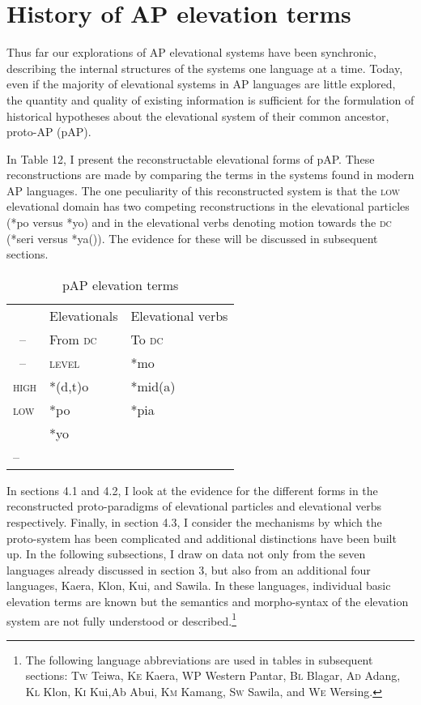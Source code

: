 \section{History of AP elevation terms}
Thus far our explorations of AP elevational systems have been synchronic, describing the internal structures of the systems one language at a time. Today, even if the majority of elevational systems in AP languages are little explored, the quantity and quality of existing information is sufficient for the formulation of historical hypotheses about the elevational system of their common ancestor, proto-AP (pAP).

In Table 12, I present the reconstructable elevational forms of pAP. These reconstructions are made by comparing the terms in the systems found in modern AP languages. The one peculiarity of this reconstructed system is that the \textsc{low} elevational domain has two competing reconstructions in the elevational particles (*po versus *yo) and in the elevational verbs denoting motion towards the \textsc{dc} (*seri versus *ya({\ng})). The evidence for these will be discussed in subsequent sections.




\begin{table}


\begin{tabular}{lll}
 & Elevationals& Elevational verbs\\
{~--} & From \textsc{dc} & To \textsc{dc}\\
{~--} & {\scshape level} & *mo\\
{\scshape high} & *(d,t)o & *mid(a)\\
{\scshape low} & *po & *pia\\
 & *yo & \\
{--~}

\end{tabular}

\caption {pAP elevation terms}
\end{table}

In sections 4.1 and 4.2, I look at the evidence for the different forms in the reconstructed proto-paradigms of elevational particles and elevational verbs respectively. Finally, in section 4.3, I consider the mechanisms by which the proto-system has been complicated and additional distinctions have been built up. In the following subsections, I draw on data not only from the seven languages already discussed in section 3, but also from an additional four languages, Kaera, Klon, Kui, and Sawila. In these languages, individual basic elevation terms are known but the semantics and morpho-syntax of the elevation system are not fully understood or described.\footnote{{}  The following language abbreviations are used in tables in subsequent sections: \textsc{Tw} Teiwa, \textsc{Ke} Kaera, \textsc{WP} Western Pantar, \textsc{Bl} Blagar, \textsc{Ad} Adang, \textsc{Kl} Klon, \textsc{Ki} Kui,\textsc Ab  Abui, \textsc{Km} Kamang, \textsc{Sw} Sawila, and \textsc{We} Wersing.}


